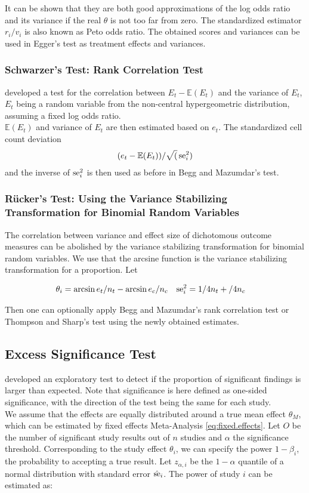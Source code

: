 \documentclass[11pt,a4paper,twoside]{book}\usepackage[]{graphicx}\usepackage[]{color}
\begin{document}
It can be shown that they are both good approximations of the log odds ratio and its variance if the real $\theta$ is not too far from zero. The standardized estimator $r_i/v_i$ is also known as Peto odds ratio. The obtained scores and variances can be used in Egger's test as treatment effects and variances.


\subsubsection{Schwarzer's Test: Rank Correlation Test} \label{sec:Schwarzer}
\citet{Schwarzer} developed a test for the correlation between $E_t - \mathbb{E}(E_t)$ and the variance of $E_t$, $E_t$ being a random variable from the non-central hypergeometric distribution, assuming a fixed log odds ratio. \\
$\mathbb{E}(E_t)$ and variance of $E_t$ are then estimated based on $e_t$. The standardized cell count deviation 
\begin{align}
(e_t - \mathbb{E}(E_t))/\sqrt(\operatorname{se}_i^2)
\end{align}
and the inverse of $\operatorname{se}_i^2$ is then used as before in Begg and Mazumdar's test.

\subsubsection{R\"ucker's Test: Using the Variance Stabilizing Transformation for Binomial Random Variables} \label{sec:Rucker}
The correlation between variance and effect size of dichotomous outcome measures can be abolished by the variance stabilizing transformation for binomial random variables. We use that the arcsine function is the variance stabilizing transformation for a proportion. Let

\begin{align}
\theta_i &= \arcsin{e_t/n_t} - \arcsin{e_c/n_c} \nonumber &
\operatorname{se}_i^2 &= 1/4n_t + /4n_c \nonumber
\end{align}

Then one can optionally apply Begg and Mazumdar's rank correlation test or Thompson and Sharp's test using the newly obtained estimates.


\subsection{Excess Significance Test} \label{sec:excess.significance}
\citet{excess.significance} developed an exploratory test to detect if the proportion of significant findings is larger than expected. Note that significance is here defined as one-sided significance, with the direction of the test being the same for each study. \\
We assume that the effects are equally distributed around a true mean effect $\theta_M$, which can be estimated by fixed effects Meta-Analysis \eqref{eq:fixed.effects}. Let $O$ be the number of significant study results out of $n$ studies and $\alpha$ the significance threshold. Corresponding to the study effect $\theta_i$, we can specify the power $1 - \beta_i$, the probability to accepting a true result. Let $z_{\alpha,i}$ be the $1-\alpha$ quantile of a normal distribution with standard error $\hat{\operatorname{se}}_i$. The power of study $i$ can be estimated as:
\end{document}
